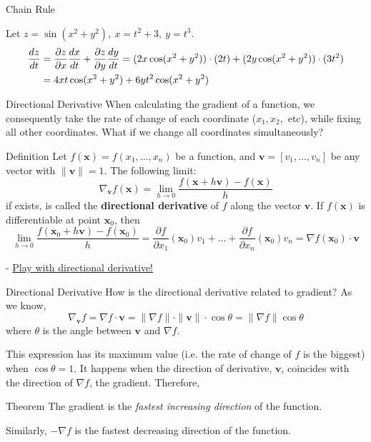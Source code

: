 \documentclass{beamer}
\newcommand{\vv}{\mathbf{v}}
\newcommand{\vx}{\mathbf{x}}
\begin{document}
\begin{frame}{Chain Rule}
\begin{example}
    Let $z
=
\sin
(
x^2
+
y^2
)
,
  \:
x
=
t^2
+
3
,\: y
=
t^3$.
\begin{align*}
{dz\over dt}&={\partial z\over \partial x}{dx\over dt}+ {\partial z\over \partial y}{dy\over dt}=(2x \cos(x^2+y^2))\cdot (2t)+(2y \cos(x^2+y^2))\cdot(3t^2)\\&=4xt\cos(x^2+y^2)+6yt^2\cos(x^2+y^2)
\end{align*}
\end{example}
\end{frame}


\begin{frame}{Directional Derivative}
When calculating the gradient of a function, we consequently take the rate of change of each coordinate ($x_1, x_2,$ etc), while fixing all other coordinates. What if we change all coordinates simultaneously?\pause

\begin{block}{Definition}
Let $f(\vx)=f(x_1,\dots,x_n)$ be a function, and $\vv=[v_1, \ldots, v_n]$ be any vector with $\|\vv\|=1$. \pause The following limit:
\[\nabla_{\mathbf{v}}{f}(\mathbf{x}) = \lim_{h \to 0}{\frac{f(\mathbf{x} + h\mathbf{v}) - f(\mathbf{x})}{h}}\]
if exists, is called the \textbf{directional derivative} of $f$ along the vector $\vv$.
\pause
    If $f(\vx)$ is differentiable at point $\vx_0$, then
    \[\lim_{{h \to 0}} \frac{f(\vx_0 + h\vv) - f(\vx_0)}{h} = \frac{\partial f}{\partial x_1}(\vx_0) v_1 + \ldots + \frac{\partial f}{\partial x_n}(\vx_0) v_n = \nabla f(\vx_0) \cdot \vv\]
\end{block}
\pause - \color{blue} \href{https://www.geogebra.org/m/Bx8nFMNc}{Play with directional derivative!}
\end{frame}


\begin{frame}{Directional Derivative}
How is the directional derivative related to gradient? \pause
As we know,
\begin{equation*}
\nabla_{\vv}f=\nabla f\cdot \vv=\|\nabla f\|\cdot \|\vv\| \cdot \cos\theta= \|\nabla f\|\cos\theta
\end{equation*}
where $\theta$ is the angle between $\vv$ and $\nabla f$. \pause
     \vspace{0.3cm}

This expression has its maximum value (i.e. the rate of change of $f$ is the biggest) when $\cos \theta=1$. It happens when the direction of derivative, $\vv$, coincides with the direction of $\nabla f$, the gradient. \pause Therefore,

\begin{block}{Theorem}
    The gradient is the \textit{fastest increasing direction} of the
function.
\end{block}
\pause Similarly, $-\nabla f$ is the fastest decreasing direction of the function.
\end{frame}
\end{document}
